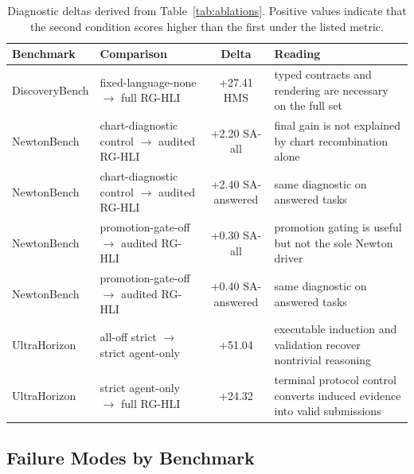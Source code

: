 \documentclass[letterpaper]{article}
\newcommand{\tblhdr}{\rowcolor{headerrow}}
\newcommand{\methodshort}{\textsc{RG-HLI}\xspace}
\begin{document}
\begin{table}[H]
\centering
\caption{Diagnostic deltas derived from Table~\ref{tab:ablations}. Positive
values indicate that the second condition scores higher than the first under
the listed metric.}
\label{tab:ablation_deltas}
\small
\setlength{\tabcolsep}{5pt}
\begin{tabularx}{0.96\textwidth}{@{}lYcY@{}}
\toprule
\tblhdr
Benchmark & Comparison & Delta & Reading \\
\midrule
{}
DiscoveryBench & fixed-language-none $\rightarrow$ full \methodshort & +27.41 HMS & typed contracts and rendering are necessary on the full set \\
\midrule
{}
NewtonBench & chart-diagnostic control $\rightarrow$ audited \methodshort & +2.20 SA-all & final gain is not explained by chart recombination alone \\
NewtonBench & chart-diagnostic control $\rightarrow$ audited \methodshort & +2.40 SA-answered & same diagnostic on answered tasks \\
NewtonBench & promotion-gate-off $\rightarrow$ audited \methodshort & +0.30 SA-all & promotion gating is useful but not the sole Newton driver \\
NewtonBench & promotion-gate-off $\rightarrow$ audited \methodshort & +0.40 SA-answered & same diagnostic on answered tasks \\
\midrule
{}
UltraHorizon & all-off strict $\rightarrow$ strict agent-only & +51.04 & executable induction and validation recover nontrivial reasoning \\
UltraHorizon & strict agent-only $\rightarrow$ full \methodshort & +24.32 & terminal protocol control converts induced evidence into valid submissions \\
\bottomrule
\end{tabularx}
\end{table}

\subsection*{Failure Modes by Benchmark}
\end{document}
